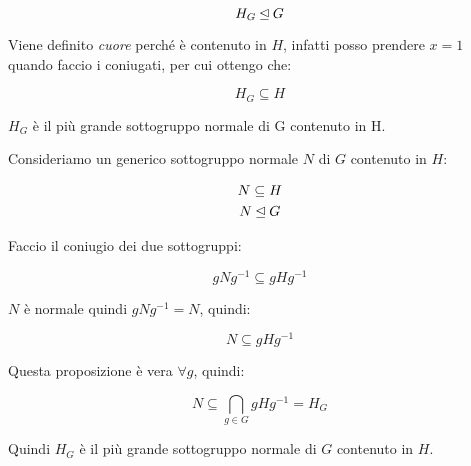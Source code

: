 \begin{equation}
	H_G \unlhd G
\end{equation}

Viene definito \emph{cuore} perché è contenuto in $H$, infatti posso prendere $x = 1$ quando faccio i coniugati, per cui ottengo che:

\begin{equation}
	H_G \subseteq H
\end{equation}

\begin{teorema}
	$H_G$ è il più grande sottogruppo normale di G contenuto in H.
\end{teorema}
\begin{dimostrazione}
	Consideriamo un generico sottogruppo normale $N$ di $G$ contenuto in $H$:
	
	\begin{gather}
		N \subseteq H \\
		N \unlhd G
	\end{gather}

	Faccio il coniugio dei due sottogruppi:
	
	\begin{equation}
		gNg^{-1} \subseteq gHg^{-1}
	\end{equation}

	$N$ è normale quindi $gNg^{-1} = N$, quindi:
	
	\begin{equation}
		N \subseteq gHg^{-1}
	\end{equation}

	Questa proposizione è vera $\forall g$, quindi:
	
	\begin{equation}
		N \subseteq \bigcap_{g \in G} gHg^{-1} = H_G
	\end{equation}

	Quindi $H_G$ è il più grande sottogruppo normale di $G$ contenuto in $H$.
\end{dimostrazione}

